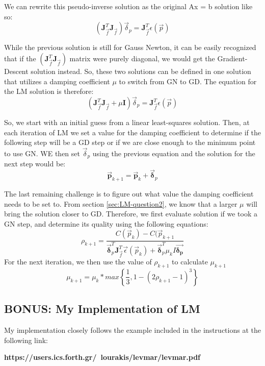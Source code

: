 \documentclass{article}
\begin{document}
We can rewrite this pseudo-inverse solution as the original Ax = b solution like so:
\[\left(\boldsymbol{J}_{\Vec{f}}^T \boldsymbol{J}_{\Vec{f}}\right)\Vec{\delta}_p = \boldsymbol{J}_{\Vec{f}}^T \epsilon(\Vec{p})\]

While the previous solution is still for Gauss Newton, it can be easily recognized that if the $\left(\boldsymbol{J}_{\Vec{f}}^T \boldsymbol{J}_{\Vec{f}}\right)$ matrix were purely diagonal, we would get the Gradient-Descent solution instead. So, these two solutions can be defined in one solution that utilizes a damping coefficient $\mu$ to switch from GN to GD. The equation for the LM solution is therefore:
\[\left(\boldsymbol{J}_{\Vec{f}}^T \boldsymbol{J}_{\Vec{f}} + \mu \boldsymbol{I}\right)\Vec{\delta}_p = \boldsymbol{J}_{\Vec{f}}^T \epsilon(\Vec{p})\]

So, we start with an initial guess from a linear least-squares solution. Then, at each iteration of LM we set a value for the damping coefficient to determine if the following step will be a GD step or if we are close enough to the minimum point to use GN. WE then set $\Vec{\delta}_p$ using the previous equation and the solution for the next step would be: 
\[\boldsymbol{\Vec{p}}_{k+1} = \boldsymbol{\Vec{p}}_{k} + \boldsymbol{\Vec{\delta}}_p\]

The last remaining challenge is to figure out what value the damping coefficient needs to be set to. From section \ref{sec:LM-question2}, we know that a larger $\mu$ will bring the solution closer to GD. Therefore, we first evaluate solution if we took a GN step, and determine its quality using the following equations:
\[\rho_{k+1} = \frac{C (\Vec{p}_k) - C (\Vec{p}_{k+1}}{\boldsymbol{\Vec{\delta}}_p^T \boldsymbol{J}_{\Vec{f}}^T \Vec{\epsilon} (\Vec{p}_k) + \boldsymbol{\Vec{\delta}}_p^T \mu_k I \boldsymbol{\Vec{\delta_p}}}\]
For the next iteration, we then use the value of $\rho_{k+1}$ to calculate $\mu_{k+1}$
\[\mu_{k+1} = \mu_k * max\left\{\frac{1}{3}, 1-\left(2\rho_{k+1} - 1\right)^3\right\}\]

\subsection{BONUS: My Implementation of LM}
My implementation closely follows the example included in the instructions at the following link: 

\textbf{https://users.ics.forth.gr/~lourakis/levmar/levmar.pdf}
\end{document}
